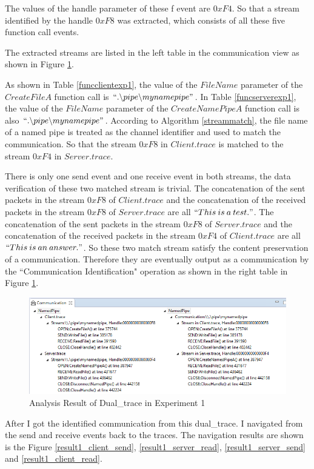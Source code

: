 The values of the handle parameter of these f event are $0xF4$. So that a stream identified by the handle $0xF8$ was extracted, which consists of all these five function call events. 

The extracted streams are listed in the left table in the communication view as shown in Figure \ref{result1}.

As shown in Table \ref{funcclientexp1}, the value of the $FileName$ parameter of the $CreateFileA$ function call is $``.\backslash pipe \backslash mynamepipe"$. In Table \ref{funcserverexp1}, the value of the $FileName$ parameter of the $CreateNamePipeA$ function call is also $``.\backslash pipe \backslash mynamepipe"$. According to Algorithm \ref{streammatch}, the file name of a named pipe is treated as the channel identifier and used to match the communication. So that the stream $0xF8$ in $Client.trace$ is matched to the stream $0xF4$ in $Server.trace$.

There is only one send event and one receive event in both streams, the data verification of these two matched stream is trivial. The concatenation of the sent packets in the stream $0xF8$ of $Client.trace$ and the concatenation of the received packets in the stream $0xF8$ of $Server.trace$ are all $``This\: is\: a\: test."$. The concatenation of the sent packets in the stream $0xF8$ of $Server.trace$ and the concatenation of the received packets in the stream $0xF4$ of $Client.trace$ are all $``This\: is\: an\: answer."$. So these two match stream satisfy the content preservation of a communication. Therefore they are eventually output as a communication by the ``Communication Identification" operation as shown in the right table in Figure \ref{result1}.


\begin{figure}[H]
\centerline{\includegraphics[scale=0.65]{Figures/result1}}
 \caption{Analysis Result of Dual\_trace in Experiment 1}
\label{result1}
\end{figure}

After I got the identified communication from this dual\_trace. I navigated from the send and receive events back to the traces. The navigation results are shown is the Figure \ref{result1_client_send},
\ref{result1_server_read}, 
\ref{result1_server_send} and \ref{result1_client_read}.




